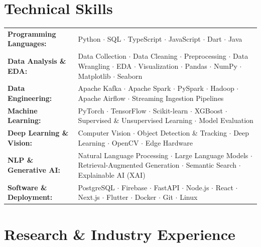 \documentclass[10pt, letterpaper]{article}
\begin{document}
\section{Technical Skills}

\begin{tabularx}{\linewidth}{@{}p{1.85in}X@{}}
  \textbf{Programming Languages:}    & Python $\cdot$ SQL $\cdot$ TypeScript $\cdot$ JavaScript $\cdot$ Dart $\cdot$ Java \\[2pt]
  \textbf{Data Analysis \& EDA:}     & Data Collection $\cdot$ Data Cleaning $\cdot$ Preprocessing $\cdot$ Data Wrangling $\cdot$ EDA $\cdot$ Visualization $\cdot$ Pandas $\cdot$ NumPy $\cdot$ Matplotlib $\cdot$ Seaborn \\[2pt]
  \textbf{Data Engineering:}         & Apache Kafka $\cdot$ Apache Spark $\cdot$ PySpark $\cdot$ Hadoop $\cdot$ Apache Airflow $\cdot$ Streaming Ingestion Pipelines \\[2pt]
  \textbf{Machine Learning:}         & PyTorch $\cdot$ TensorFlow $\cdot$ Scikit-learn $\cdot$ XGBoost $\cdot$ Supervised \& Unsupervised Learning $\cdot$ Model Evaluation \\[2pt]
  \textbf{Deep Learning \& Vision:}  & Computer Vision $\cdot$ Object Detection \& Tracking $\cdot$ Deep Learning $\cdot$ OpenCV $\cdot$ Edge Hardware \\[2pt]
  \textbf{NLP \& Generative AI:}     & Natural Language Processing $\cdot$ Large Language Models $\cdot$ Retrieval-Augmented Generation $\cdot$ Semantic Search $\cdot$ Explainable AI (XAI) \\[2pt]
  \textbf{Software \& Deployment:}   & PostgreSQL $\cdot$ Firebase $\cdot$ FastAPI $\cdot$ Node.js $\cdot$ React $\cdot$ Next.js $\cdot$ Flutter $\cdot$ Docker $\cdot$ Git $\cdot$ Linux
\end{tabularx}

\section{Research \& Industry Experience}
\end{document}
